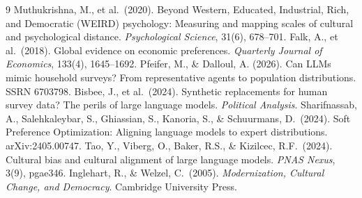 \documentclass[11pt]{article}
\begin{document}
\begin{thebibliography}{9}
 Muthukrishna, M., et al.\ (2020). Beyond Western, Educated, Industrial, Rich, and Democratic (WEIRD) psychology: Measuring and mapping scales of cultural and psychological distance. \emph{Psychological Science}, 31(6), 678--701.
 Falk, A., et al.\ (2018). Global evidence on economic preferences. \emph{Quarterly Journal of Economics}, 133(4), 1645--1692.
 Pfeifer, M., \& Dalloul, A. (2026). Can LLMs mimic household surveys? From representative agents to population distributions. SSRN 6703798.
 Bisbee, J., et al.\ (2024). Synthetic replacements for human survey data? The perils of large language models. \emph{Political Analysis}.
 Sharifnassab, A., Salehkaleybar, S., Ghiassian, S., Kanoria, S., \& Schuurmans, D.\ (2024). Soft Preference Optimization: Aligning language models to expert distributions. arXiv:2405.00747.
 Tao, Y., Viberg, O., Baker, R.S., \& Kizilcec, R.F.\ (2024). Cultural bias and cultural alignment of large language models. \emph{PNAS Nexus}, 3(9), pgae346.
 Inglehart, R., \& Welzel, C.\ (2005). \emph{Modernization, Cultural Change, and Democracy}. Cambridge University Press.
\end{thebibliography}
\end{document}
